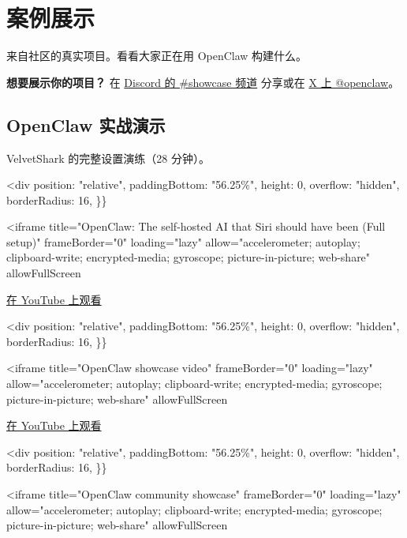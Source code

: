 \clearpage

\section{案例展示}


来自社区的真实项目。看看大家正在用 OpenClaw 构建什么。

\textbf{想要展示你的项目？} 在 \href{https://discord.gg/clawd}{Discord 的 \#showcase 频道} 分享或在 \href{https://x.com/openclaw}{X 上 @openclaw}。

\subsection{OpenClaw 实战演示}


VelvetShark 的完整设置演练（28 分钟）。

<div
position: "relative",
paddingBottom: "56.25\%",
height: 0,
overflow: "hidden",
borderRadius: 16,
\}\}
\begin{quote}

\end{quote}

<iframe
title="OpenClaw: The self-hosted AI that Siri should have been (Full setup)"
frameBorder="0"
loading="lazy"
allow="accelerometer; autoplay; clipboard-write; encrypted-media; gyroscope; picture-in-picture; web-share"
allowFullScreen

\href{https://www.youtube.com/watch?v=SaWSPZoPX34}{在 YouTube 上观看}

<div
position: "relative",
paddingBottom: "56.25\%",
height: 0,
overflow: "hidden",
borderRadius: 16,
\}\}
\begin{quote}

\end{quote}

<iframe
title="OpenClaw showcase video"
frameBorder="0"
loading="lazy"
allow="accelerometer; autoplay; clipboard-write; encrypted-media; gyroscope; picture-in-picture; web-share"
allowFullScreen

\href{https://www.youtube.com/watch?v=mMSKQvlmFuQ}{在 YouTube 上观看}

<div
position: "relative",
paddingBottom: "56.25\%",
height: 0,
overflow: "hidden",
borderRadius: 16,
\}\}
\begin{quote}

\end{quote}

<iframe
title="OpenClaw community showcase"
frameBorder="0"
loading="lazy"
allow="accelerometer; autoplay; clipboard-write; encrypted-media; gyroscope; picture-in-picture; web-share"
allowFullScreen

